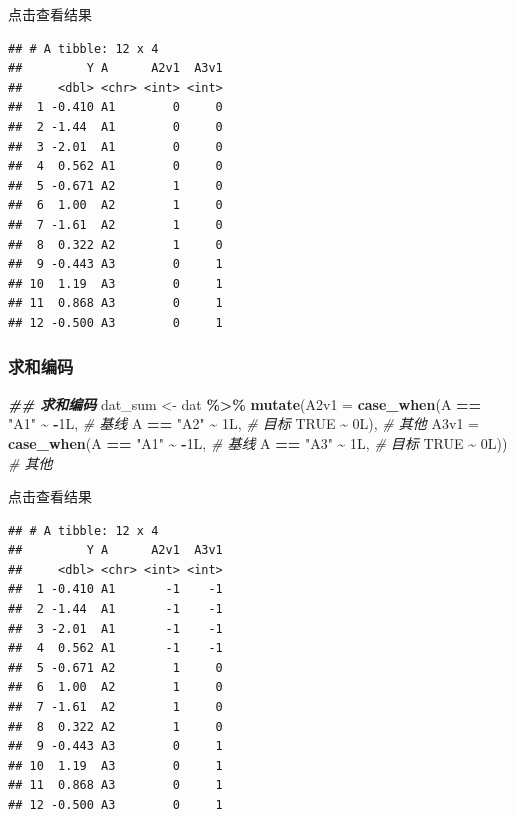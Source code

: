 \documentclass[
]{book}
\newenvironment{Shaded}{\begin{snugshade}}{\end{snugshade}}
\newcommand{\AttributeTok}[1]{\textcolor[rgb]{0.13,0.29,0.53}{#1}}
\newcommand{\CommentTok}[1]{\textcolor[rgb]{0.56,0.35,0.01}{\textit{#1}}}
\newcommand{\ConstantTok}[1]{\textcolor[rgb]{0.56,0.35,0.01}{#1}}
\newcommand{\DocumentationTok}[1]{\textcolor[rgb]{0.56,0.35,0.01}{\textbf{\textit{#1}}}}
\newcommand{\FunctionTok}[1]{\textcolor[rgb]{0.13,0.29,0.53}{\textbf{#1}}}
\newcommand{\NormalTok}[1]{#1}
\newcommand{\OtherTok}[1]{\textcolor[rgb]{0.56,0.35,0.01}{#1}}
\newcommand{\SpecialCharTok}[1]{\textcolor[rgb]{0.81,0.36,0.00}{\textbf{#1}}}
\newcommand{\StringTok}[1]{\textcolor[rgb]{0.31,0.60,0.02}{#1}}
\begin{document}
点击查看结果

\begin{verbatim}
## # A tibble: 12 x 4
##         Y A      A2v1  A3v1
##     <dbl> <chr> <int> <int>
##  1 -0.410 A1        0     0
##  2 -1.44  A1        0     0
##  3 -2.01  A1        0     0
##  4  0.562 A1        0     0
##  5 -0.671 A2        1     0
##  6  1.00  A2        1     0
##  7 -1.61  A2        1     0
##  8  0.322 A2        1     0
##  9 -0.443 A3        0     1
## 10  1.19  A3        0     1
## 11  0.868 A3        0     1
## 12 -0.500 A3        0     1
\end{verbatim}

\hypertarget{ux6c42ux548cux7f16ux7801-2}{%
\subsubsection{求和编码}\label{ux6c42ux548cux7f16ux7801-2}}

\begin{Shaded}
\begin{Highlighting}[]
\DocumentationTok{\#\# 求和编码}
\NormalTok{dat\_sum }\OtherTok{\textless{}{-}}\NormalTok{ dat }\SpecialCharTok{\%\textgreater{}\%}
  \FunctionTok{mutate}\NormalTok{(}\AttributeTok{A2v1 =} \FunctionTok{case\_when}\NormalTok{(A }\SpecialCharTok{==} \StringTok{"A1"} \SpecialCharTok{\textasciitilde{}} \SpecialCharTok{{-}}\NormalTok{1L, }\CommentTok{\# 基线}
\NormalTok{                          A }\SpecialCharTok{==} \StringTok{"A2"} \SpecialCharTok{\textasciitilde{}}\NormalTok{ 1L,  }\CommentTok{\# 目标}
                          \ConstantTok{TRUE}      \SpecialCharTok{\textasciitilde{}}\NormalTok{ 0L), }\CommentTok{\# 其他}
         \AttributeTok{A3v1 =} \FunctionTok{case\_when}\NormalTok{(A }\SpecialCharTok{==} \StringTok{"A1"} \SpecialCharTok{\textasciitilde{}} \SpecialCharTok{{-}}\NormalTok{1L, }\CommentTok{\# 基线}
\NormalTok{                          A }\SpecialCharTok{==} \StringTok{"A3"} \SpecialCharTok{\textasciitilde{}}\NormalTok{  1L, }\CommentTok{\# 目标}
                          \ConstantTok{TRUE}      \SpecialCharTok{\textasciitilde{}}\NormalTok{ 0L)) }\CommentTok{\# 其他}
\end{Highlighting}
\end{Shaded}

点击查看结果

\begin{verbatim}
## # A tibble: 12 x 4
##         Y A      A2v1  A3v1
##     <dbl> <chr> <int> <int>
##  1 -0.410 A1       -1    -1
##  2 -1.44  A1       -1    -1
##  3 -2.01  A1       -1    -1
##  4  0.562 A1       -1    -1
##  5 -0.671 A2        1     0
##  6  1.00  A2        1     0
##  7 -1.61  A2        1     0
##  8  0.322 A2        1     0
##  9 -0.443 A3        0     1
## 10  1.19  A3        0     1
## 11  0.868 A3        0     1
## 12 -0.500 A3        0     1
\end{verbatim}
\end{document}
